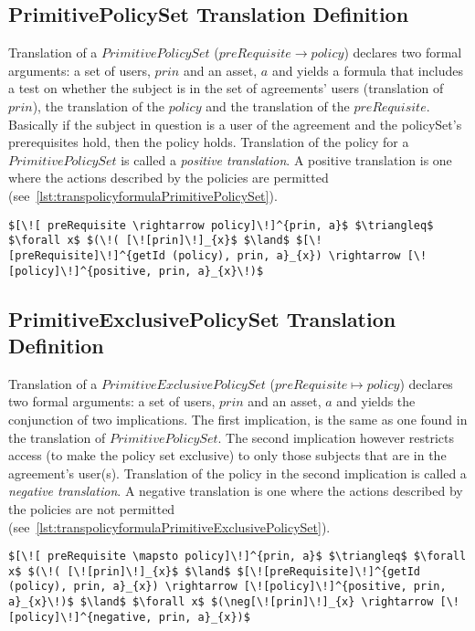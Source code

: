 \subsection{PrimitivePolicySet Translation Definition}
Translation of a $PrimitivePolicySet$ ($preRequisite \rightarrow policy$) declares two formal arguments: a set of users, $prin$ and an asset, $a$ and yields a formula that includes a test on whether the subject is in the set of agreements' users (translation of $prin$), the translation of the $policy$ and the translation of the $preRequisite$. Basically if the subject in question is a user of the agreement and the policySet's prerequisites hold, then the policy holds. Translation of the policy for a $PrimitivePolicySet$ is called a \emph{positive translation}. A positive translation is one where the actions described by the policies are permitted (see~\ref{lst:transpolicyformulaPrimitivePolicySet}).   

\lstset{mathescape, language=AST}  
\begin{lstlisting}[frame=single, caption={Policy Set Translation Definition {$\colon$} PrimitivePolicySet},label={lst:transpolicyformulaPrimitivePolicySet}]
$[\![ preRequisite \rightarrow policy]\!]^{prin, a}$ $\triangleq$ $\forall x$ $(\!( [\![prin]\!]_{x}$ $\land$ $[\![preRequisite]\!]^{getId (policy), prin, a}_{x}) \rightarrow [\![policy]\!]^{positive, prin, a}_{x}\!)$
\end{lstlisting}





\subsection{PrimitiveExclusivePolicySet Translation Definition}
Translation of a $PrimitiveExclusivePolicySet$ ($preRequisite \mapsto policy$) declares two formal arguments: a set of users, $prin$ and an asset, $a$ and yields the conjunction of two implications. The first implication, is the same as one found in the translation of $PrimitivePolicySet$. The second implication however restricts access (to make the policy set exclusive) to only those subjects that are in the agreement's user(s). Translation of the policy in the second implication is called a \emph{negative translation}. A negative translation is one where the actions described by the policies are not permitted (see~\ref{lst:transpolicyformulaPrimitiveExclusivePolicySet}).


\lstset{mathescape, language=AST}  
\begin{lstlisting}[frame=single, caption={Policy Set Translation Definition {$\colon$} PrimitiveExclusivePolicySet},label={lst:transpolicyformulaPrimitiveExclusivePolicySet}]
$[\![ preRequisite \mapsto policy]\!]^{prin, a}$ $\triangleq$ $\forall x$ $(\!( [\![prin]\!]_{x}$ $\land$ $[\![preRequisite]\!]^{getId (policy), prin, a}_{x}) \rightarrow [\![policy]\!]^{positive, prin, a}_{x}\!)$ $\land$ $\forall x$ $(\neg[\![prin]\!]_{x} \rightarrow [\![policy]\!]^{negative, prin, a}_{x})$
\end{lstlisting}

